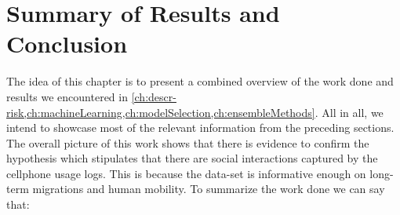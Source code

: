 

\chapter{Summary of Results and Conclusion}\label{ch:results_conclusion}




The idea of this chapter is to present a combined overview of the work done and results we encountered in
\cref{ch:descr-risk,ch:machineLearning,ch:modelSelection,ch:ensembleMethods}.
All in all, we intend to showcase most of the relevant information from the preceding sections.
The overall picture of this work shows that there is evidence to confirm the hypothesis which stipulates that there are social interactions captured by the cellphone usage logs.
This is because the data-set is informative enough on long-term migrations and human mobility.
To summarize the work done we can say that:



